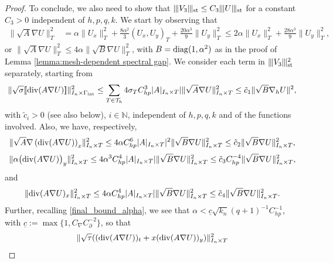 \documentclass{amsart}
\newcommand{\norm}[2]{\|{#1}\|_{{#2}}}
\newcommand{\jump}[1]{[\kern-0.6mm [{#1}]\kern-0.6mm]}
\newcommand{\su}{\sum_{T \in \Th}}
\newcommand{\Th}{\mathcal{T}_h}
\newcommand{\gint}{\Gamma_{\rm int}}
\newcommand{\Div}{{\rm div}}
\newcommand{\ndg}[1]{|\kern-.03cm \|{#1}|\kern-.03cm \|}
\newcommand{\cinvT}{C_{\partial}}
\newcommand{\cinv}{C_{\nabla}}
\newcommand{\chp}{C_{hp}}
\theoremstyle{definition}
\theoremstyle{remark}
\numberwithin{equation}{section}
\begin{document}
\begin{proof}
 To conclude, we also need to show that $\ndg{V_3 }_{\rm st}\leq C_3 \ndg{U}_{\rm st}$ for a constant $C_3>0$ independent of $h,p,q,k$. We start by observing that
\begin{equation}\label{eq: A norm bound}
	\begin{split}
		\|\sqrt{A}\nabla U\|_T^2
		& =  \alpha \|U_x\|_T^2 + \frac{8\alpha^2}{3} (U_x, U_y)_T + \frac{20\alpha^3}{9}   \|U_y\|_T^2
		\leq 2\alpha \|U_x\|_T^2  +  \frac{28\alpha^3}{9}   \|U_y\|_T^2,
	\end{split}
\end{equation}
or 	$\|\sqrt{A}\nabla U\|_T^2 \le 4\alpha  \norm{\sqrt{B}\nabla U}{T}^2$, with $B= {\rm diag}(1,\alpha^2)$ as in the proof of Lemma \ref{lemma:mesh-dependent spectral gap}.
We consider each term in $\ndg{V_3 }_{\rm st}^2$ separately, starting from
\begin{equation*}
		\norm{\sqrt{\sigma} \jump{\Div(A \nabla U)}}{I_n\times \gint }^2
		\leq
\su
		4\sigma_T \chp^3 |A|_{I_n\times T}|   \norm{\sqrt{A} \nabla U}{ I_n\times T }^2
		 \le  \tilde{c}_1\norm{\sqrt{B}\nabla_h U}{}^2 ,
\end{equation*}
with $\tilde{c}_i>0$ (see also below), $i\in\mathbb{N}$, independent of $h,p,q,k$ and of the functions involved.
Also, we have, respectively,
\begin{equation*}
		   \norm{\sqrt{A}\nabla \left(\Div(A\nabla U) \right)_x}{I_n\times T}^2
		\leq
	4	\alpha \chp^6  |A|_{I_n\times T}|^2  \norm{\sqrt{B}\nabla U}{I_n\times T}^2\le \tilde{c}_2 \norm{\sqrt{B}\nabla U}{I_n\times T}^2,
\end{equation*}
\begin{equation*}
		  \norm{\alpha  \big(\Div(A\nabla U) \big)_y}{I_n\times T}^2
		\leq  4  \alpha^3\chp^4 |A|_{I_n\times T}|  \norm{\sqrt{B}\nabla U}{I_n\times T}^2
			\leq  \tilde{c}_3  \chp^{-4} \norm{\sqrt{B}\nabla U}{I_n\times T}^2,
\end{equation*}
and
\begin{equation*}
		\norm{\Div(A\nabla U)_x}{I_n\times T}^2
	     \leq
 4 \alpha\chp^4 |A|_{I_n\times T}|  \norm{\sqrt{B}\nabla U}{I_n\times T}^2\le \tilde{c}_4 \norm{\sqrt{B}\nabla U}{I_n\times T}^2.
\end{equation*}
Further, recalling \eqref{final_bound_alpha}, we see that $\alpha< \underline{c}\sqrt{k_n}(q+1)^{-1}\chp^{-1}$,  with $\underline{c}:= \max\{1,\cinv\cinvT^{-2}\}$, so that
\begin{equation*}\begin{split}
		&   \norm{ \sqrt{\tau}((\Div(A\nabla U))_t + x(\Div(A\nabla U))_y) }{I_n\times T}^2\\

\end{split}
\end{equation*}
\end{proof}
\end{document}
